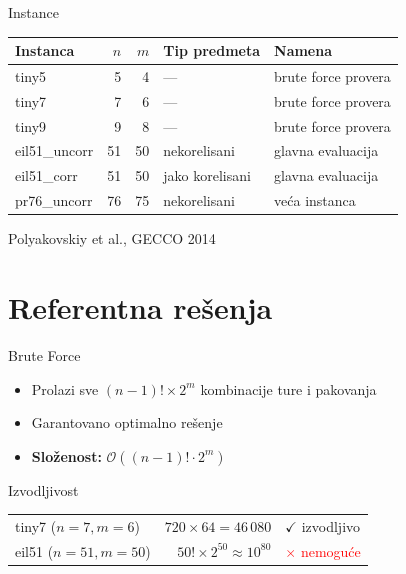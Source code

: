 \documentclass[aspectratio=169]{beamer}
\begin{document}
\begin{frame}{Instance}
  \begin{center}
  \begin{tabular}{lrrll}
    \toprule
    \textbf{Instanca} & \textbf{$n$} & \textbf{$m$} & \textbf{Tip predmeta} & \textbf{Namena} \\
    \midrule
    tiny5  &  5 &  4 & ---                    & brute force provera \\
    tiny7  &  7 &  6 & ---                    & brute force provera \\
    tiny9  &  9 &  8 & ---                    & brute force provera \\
    eil51\_uncorr & 51 & 50 & nekorelisani    & glavna evaluacija \\
    eil51\_corr   & 51 & 50 & jako korelisani & glavna evaluacija \\
    pr76\_uncorr  & 76 & 75 & nekorelisani    & veća instanca \\
    \bottomrule
  \end{tabular}
  \end{center}

  \medskip
  {\small Polyakovskiy et al., GECCO 2014}
\end{frame}

\section{Referentna rešenja}

\begin{frame}{Brute Force}
  \begin{itemize}
    \item Prolazi sve $(n-1)! \times 2^m$ kombinacije ture i pakovanja
    \item Garantovano optimalno rešenje
    \item \textbf{Složenost:} $\mathcal{O}\!\left((n-1)!\cdot 2^m\right)$
  \end{itemize}

  \bigskip
  \begin{block}{Izvodljivost}
    \begin{tabular}{lrl}
      tiny7 ($n=7, m=6$)    & $720 \times 64 = 46\,080$    & \textcolor{green!60!black}{$\checkmark$ izvodljivo} \\
      eil51 ($n=51, m=50$)  & $50!\times 2^{50}\approx 10^{80}$ & \textcolor{red}{$\times$ nemoguće}
    \end{tabular}
  \end{block}
\end{frame}
\end{document}
